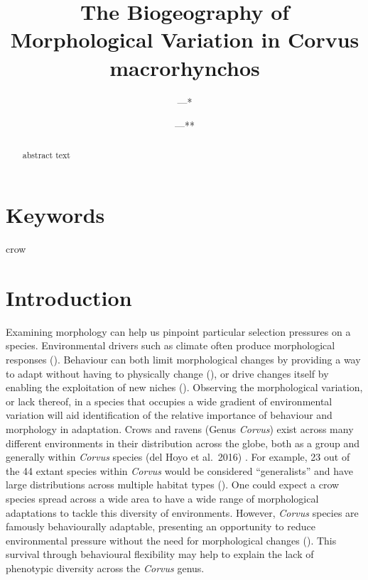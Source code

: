 \documentclass[10pt,a4paper]{article}
\begin{document}
\pagestyle{fancy}

\title{The Biogeography of Morphological Variation in Corvus macrorhynchos}
\author[1]{---*}
\author[2]{---**}
\affil[1]{---}
\affil[2]{---}
\affil[*]{---}

\maketitle
\thispagestyle{fancy}

\begin{abstract}

abstract text

\end{abstract}

\section*{Keywords}

crow

\clearpage
\pagestyle{fancy}

\section{Introduction}\label{introduction}

Examining morphology can help us pinpoint particular selection pressures on a species.
Environmental drivers such as climate often produce morphological responses ().
Behaviour can both limit morphological changes by providing a way to adapt without having to physically change (), or drive changes itself by enabling the exploitation of new niches ().
Observing the morphological variation, or lack thereof, in a species that occupies a wide gradient of environmental variation will aid identification of the relative importance of behaviour and morphology in adaptation.
Crows and ravens (Genus \emph{Corvus}) exist across many different environments in their distribution across the globe, both as a group and generally within \emph{Corvus} species (del Hoyo et al.~2016) .
For example, 23 out of the 44 extant species within \emph{Corvus} would be considered ``generalists'' and have large distributions across multiple habitat types ().
One could expect a crow species spread across a wide area to have a wide range of morphological adaptations to tackle this diversity of environments.
However, \emph{Corvus} species are famously behaviourally adaptable, presenting an opportunity to reduce environmental pressure without the need for morphological changes ().
This survival through behavioural flexibility may help to explain the lack of phenotypic diversity across the \emph{Corvus} genus.
\end{document}
